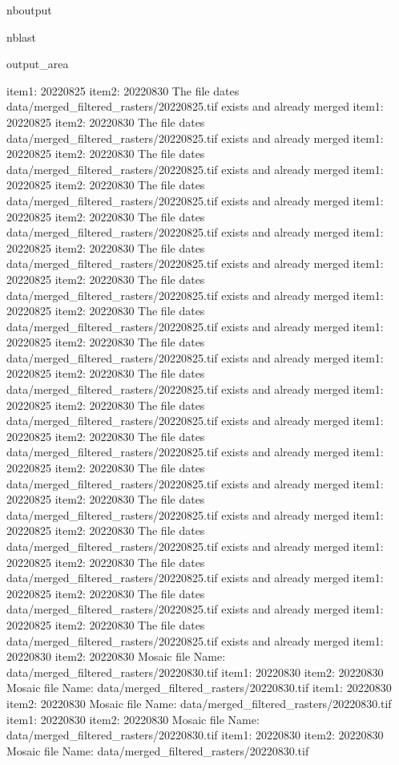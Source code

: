 \documentclass[letterpaper,10pt]{sphinxmanual}
\begin{document}
\begin{sphinxuseclass}{nboutput}
\begin{sphinxuseclass}{nblast}
{\begin{sphinxuseclass}{output_area}
\begin{sphinxuseclass}{}
\begin{sphinxVerbatim}[commandchars=\\\{\}]
item1:  20220825
item2:  20220830
The file dates data/merged\_filtered\_rasters/20220825.tif exists and already merged
item1:  20220825
item2:  20220830
The file dates data/merged\_filtered\_rasters/20220825.tif exists and already merged
item1:  20220825
item2:  20220830
The file dates data/merged\_filtered\_rasters/20220825.tif exists and already merged
item1:  20220825
item2:  20220830
The file dates data/merged\_filtered\_rasters/20220825.tif exists and already merged
item1:  20220825
item2:  20220830
The file dates data/merged\_filtered\_rasters/20220825.tif exists and already merged
item1:  20220825
item2:  20220830
The file dates data/merged\_filtered\_rasters/20220825.tif exists and already merged
item1:  20220825
item2:  20220830
The file dates data/merged\_filtered\_rasters/20220825.tif exists and already merged
item1:  20220825
item2:  20220830
The file dates data/merged\_filtered\_rasters/20220825.tif exists and already merged
item1:  20220825
item2:  20220830
The file dates data/merged\_filtered\_rasters/20220825.tif exists and already merged
item1:  20220825
item2:  20220830
The file dates data/merged\_filtered\_rasters/20220825.tif exists and already merged
item1:  20220825
item2:  20220830
The file dates data/merged\_filtered\_rasters/20220825.tif exists and already merged
item1:  20220825
item2:  20220830
The file dates data/merged\_filtered\_rasters/20220825.tif exists and already merged
item1:  20220825
item2:  20220830
The file dates data/merged\_filtered\_rasters/20220825.tif exists and already merged
item1:  20220825
item2:  20220830
The file dates data/merged\_filtered\_rasters/20220825.tif exists and already merged
item1:  20220825
item2:  20220830
The file dates data/merged\_filtered\_rasters/20220825.tif exists and already merged
item1:  20220825
item2:  20220830
The file dates data/merged\_filtered\_rasters/20220825.tif exists and already merged
item1:  20220825
item2:  20220830
The file dates data/merged\_filtered\_rasters/20220825.tif exists and already merged
item1:  20220825
item2:  20220830
The file dates data/merged\_filtered\_rasters/20220825.tif exists and already merged
item1:  20220830
item2:  20220830
Mosaic file Name:  data/merged\_filtered\_rasters/20220830.tif
item1:  20220830
item2:  20220830
Mosaic file Name:  data/merged\_filtered\_rasters/20220830.tif
item1:  20220830
item2:  20220830
Mosaic file Name:  data/merged\_filtered\_rasters/20220830.tif
item1:  20220830
item2:  20220830
Mosaic file Name:  data/merged\_filtered\_rasters/20220830.tif
item1:  20220830
item2:  20220830
Mosaic file Name:  data/merged\_filtered\_rasters/20220830.tif

\end{sphinxVerbatim}
\end{sphinxuseclass}
\end{sphinxuseclass}}
\end{sphinxuseclass}
\end{sphinxuseclass}
\end{document}
